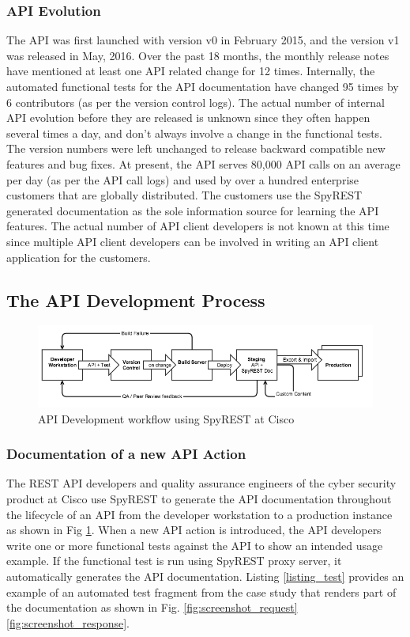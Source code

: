 \documentclass[10pt, conference]{IEEEtran}
\begin{document}
\subsubsection{API Evolution}
The API was first launched with version v0 in February 2015, and the version v1 was released in May, 2016. Over the past 18 months, the monthly release notes have mentioned at least one API related change for 12 times. Internally, the automated functional tests for the API documentation have changed 95 times by 6 contributors (as per the version control logs). The actual number of internal API evolution before they are released is unknown since they often happen several times a day, and don't always involve a change in the functional tests. The version numbers were left unchanged to release backward compatible new features and bug fixes. At present, the API serves 80,000 API calls on an average per day (as per the API call logs) and used by over a hundred enterprise customers that are globally distributed. The customers use the SpyREST generated documentation as the sole information source for learning the API features. The actual number of API client developers is not known at this time since multiple API client developers can be involved in writing an API client application for the customers.

\subsection{The API Development Process} %
\begin{figure}[t]
\begin{center}
\includegraphics[width=18cm,keepaspectratio]{spyrestflow.png}
\end{center}
\caption{API Development workflow using SpyREST at Cisco}
\label{fig:spyrest_workflow}
\end{figure}


\subsubsection{Documentation of a new API Action}

The REST API developers and quality assurance engineers of the cyber security product at Cisco use SpyREST to generate the API documentation throughout the lifecycle of an API from the developer workstation to a production instance as shown in Fig \ref{fig:spyrest_workflow}. When a new API action is introduced, the API developers write one or more functional tests against the API to show an intended usage example. If the functional test is run using SpyREST proxy server, it automatically generates the API documentation. Listing \ref{listing_test} provides an example of an automated test fragment from the case study that renders part of the documentation as shown in Fig. \ref{fig:screenshot_request} \ref{fig:screenshot_response}.
\end{document}
